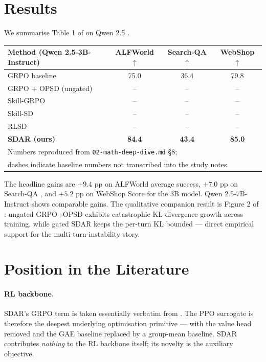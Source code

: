 \documentclass[11pt]{article}
\begin{document}
\section*{Results}

We summarise Table 1 of \citet{lu2026sdar} on Qwen 2.5 \citep{qwen2024}.

\begin{center}
\begin{tabular}{lccc}
\hline
Method (Qwen 2.5-3B-Instruct) & ALFWorld $\uparrow$ & Search-QA $\uparrow$ & WebShop $\uparrow$ \\
\hline
GRPO baseline           & 75.0 & 36.4 & 79.8 \\
GRPO + OPSD (ungated)   & --   & --   & --   \\
Skill-GRPO              & --   & --   & --   \\
Skill-SD                & --   & --   & --   \\
RLSD                    & --   & --   & --   \\
\textbf{SDAR (ours)}    & \textbf{84.4} & \textbf{43.4} & \textbf{85.0} \\
\hline
\multicolumn{4}{l}{\small Numbers reproduced from \texttt{02-math-deep-dive.md} \S 8;}\\
\multicolumn{4}{l}{\small dashes indicate baseline numbers not transcribed into the study notes.}\\
\hline
\end{tabular}
\end{center}

The headline gains are $+9.4$ pp on ALFWorld average success, $+7.0$ pp
on Search-QA \citep{searchqa2017}, and $+5.2$ pp on WebShop Score for the
3B model. Qwen 2.5-7B-Instruct shows comparable gains. The
qualitative companion result is Figure 2 of \citet{lu2026sdar}: ungated
GRPO+OPSD exhibits catastrophic KL-divergence growth across training,
while gated SDAR keeps the per-turn KL bounded --- direct empirical
support for the multi-turn-instability story.

\section*{Position in the Literature}

\paragraph{RL backbone.} SDAR's GRPO term is taken essentially verbatim
from \citet{shao2024deepseekmath}. The PPO surrogate
\citep{schulman2017ppo} is therefore the deepest underlying optimisation
primitive --- with the value head removed and the GAE baseline replaced
by a group-mean baseline. SDAR contributes \emph{nothing} to the RL
backbone itself; its novelty is the auxiliary objective.
\end{document}
